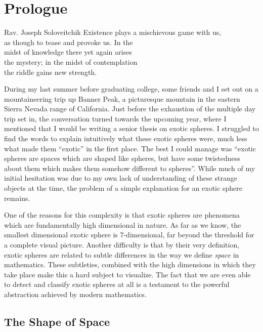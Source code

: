 \chapter*{Prologue}

\begin{epigraph}{19.5em}{Rav. Joseph Soloveitchik}
	Existence plays a mischievous game with us,\\
	as though to tease and provoke us. In the \\
	midst of knowledge there yet again arises \\
	the mystery; in the midst of contemplation\\
	the riddle gains new strength.
\end{epigraph}

During my last summer before graduating college, some friends and I set out on a mountaineering trip up Banner Peak, a picturesque mountain in the eastern Sierra Nevada range of California. Just before the exhaustion of the multiple day trip set in, the conversation turned towards the upcoming year, where I mentioned that I would be writing a senior thesis on exotic spheres.
I struggled to find the words to explain intuitively what these exotic spheres were, much less what made them ``exotic'' in the first place.
The best I could manage was ``exotic spheres are spaces which are shaped like spheres, but have some twistedness about them which makes them somehow different to spheres''. 
While much of my initial hesitation was due to my own lack of understanding of these strange objects at the time, the problem of a simple explanation for an exotic sphere remains.

One of the reasons for this complexity is that exotic spheres are phenomena which are fundamentally high dimensional in nature. As far as we know, the smallest dimensional exotic sphere is 7-dimensional, far beyond the threshold for a complete visual picture. Another difficulty is that by their very definition, exotic spheres are related to subtle differences in the way we define \emph{space} in mathematics. These subtleties, combined with the high dimensions in which they take place make this a hard subject to visualize. The fact that we are even able to detect and classify exotic spheres at all is a testament to the powerful abstraction achieved by modern mathematics.

\section*{The Shape of Space}

